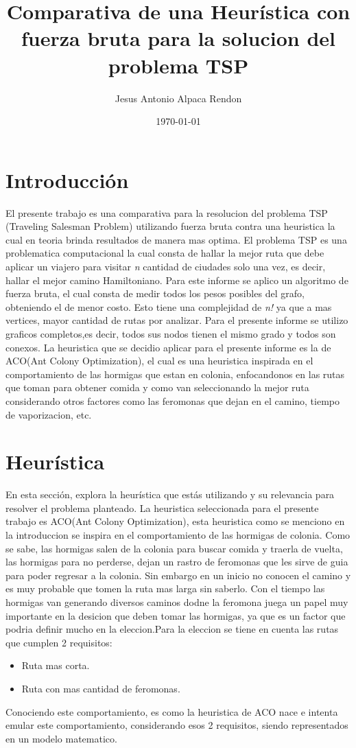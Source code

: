 \documentclass{article}
\title{Comparativa de una Heurística con fuerza bruta para la solucion del problema TSP}
\author{Jesus Antonio Alpaca Rendon}
\date{\today}
\begin{document}
\maketitle

\section{Introducción}
El presente trabajo es una comparativa para la resolucion del problema
TSP (Traveling Salesman Problem) utilizando fuerza bruta contra una heuristica la cual
en teoria brinda resultados de manera mas optima.
El problema TSP es una problematica computacional la cual consta de hallar la mejor ruta que debe aplicar un viajero para visitar \textit{n} cantidad de ciudades solo una vez,
es decir, hallar el mejor camino Hamiltoniano. Para este informe se aplico un algoritmo de fuerza bruta, el cual consta de medir todos los pesos posibles del grafo, obteniendo el de menor costo.
Esto tiene una complejidad de \textit{n!} ya que a mas vertices, mayor cantidad de rutas por analizar.
Para el presente informe se utilizo graficos completos,es decir, todos sus nodos tienen el mismo grado y todos son conexos.
La heuristica que se decidio aplicar para el presente informe es la de ACO(Ant Colony Optimization), el cual es una heuristica
inspirada en el comportamiento de las hormigas que estan en colonia, enfocandonos en las rutas que toman para obtener comida y como van seleccionando la mejor ruta
considerando otros factores como las feromonas que dejan en el camino, tiempo de vaporizacion, etc.

\section{Heurística}
En esta sección, explora la heurística que estás utilizando y su relevancia para resolver el problema planteado.
La heuristica seleccionada para el presente trabajo es ACO(Ant Colony Optimization), esta heuristica como se menciono en la introduccion se inspira en el comportamiento
de las hormigas de colonia. Como se sabe, las hormigas salen de la colonia para buscar comida y traerla de vuelta, las hormigas para no perderse, dejan un rastro de feromonas
que les sirve de guia para poder regresar a la colonia. Sin embargo en un inicio no conocen el camino y es muy probable que tomen la ruta mas larga sin saberlo.
Con el tiempo las hormigas van generando diversos caminos dodne la feromona juega un papel muy importante en la desicion que deben tomar las hormigas,
ya que es un factor que podria definir mucho en la eleccion.Para la eleccion se tiene en cuenta las rutas que cumplen 2 requisitos:
\begin{itemize}
    \item Ruta mas corta.
    \item Ruta con mas cantidad de feromonas.
\end{itemize}
Conociendo este comportamiento, es como la heuristica de ACO nace e intenta emular este comportamiento, considerando esos 2 requisitos, siendo representados en un modelo matematico.
\end{document}
